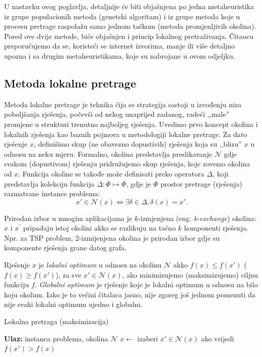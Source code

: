 \documentclass[b5paper, utf8, 11pt, colorlinks]{book}
\theoremstyle{definition}
\begin{document}
 U nastavku ovog poglavlja, detaljnije će biti objašnjena po jedna metaheuristika iz grupe populacionih metoda (genetski algoritam) i iz grupe metoda koje u procesu pretrage raspolažu samo jednom tačkom (metoda promjenljivih okolina). Pored ove dvije metode, biće objašnjen i princip lokalnog pretraživanja. Čitaocu preporučujemo da se, koristeći se internet izvorima, manje ili više detaljno upozna i sa drugim metaheuristikama, koje su nabrojane u ovom odjeljku.
 
  
 \subsection{Metoda lokalne pretrage}\label{sec: local_search}
 
 Metoda lokalne pretrage je tehnika čija se strategija sastoji u izvođenju niza poboljšanja  rješenja, počevši od nekog unaprijed zadanog, radeći ,,male'' promjene u strukturi trenutno najboljeg rješenja. Uvedimo prvo koncept okolina i lokalnih rješenja kao baznih pojmova u metodologiji lokalne pretrage. Za dato rješenje $x$, definišimo skup (ne obavezno dopustivih) rješenja koja su ,,blizu'' $x$ u odnosu na neku mjeru. Formalno, okolina predstavlja preslikavanje  $\mathcal{N}$ gdje svakom (dopustivom) rješenju pridružujemo skup rješenja, koje zovemo okolina od $x$.  Funkcija okoline se takođe može definisati preko operatora  $\Delta$, koji predstavlja kolekciju   funkcija $\Delta:\Phi \mapsto \Phi$,  gdje je $\Phi$ prostor pretrage (rješenja) razmatrane instance problema:
 $$ x' \in \mathcal{N}(x) \Longleftrightarrow \exists \delta \in \Delta,\delta(x)=x'.$$
 
 Prirodan izbor u mnogim aplikacijama je $k$-izmjenjena (eng. \emph{k-exchange}) okolina: $x$ i $x^{'}$ pripadaju istoj okolini akko se razlikuju na tačno $k$ komponenti rješenja. Npr. za TSP problem, 2-{izmijenjena} okolina je prirodan izbor gdje su komponente rješenja grane datog grafa.  
 
 
 Rješenje $x$ je \emph{lokalni optimum} u odnosu na okolinu $\mathcal{N}$ akko
 $f(x) \leq f(x')$ ($f(x) \geq f(x')$), za sve $x' \in \mathcal{N}(x)$, ako minimizujemo (maksimizujemo) ciljnu funkciju $f$.  \emph{Globalni optimum} je rješenje koje je lokalni optimum u odnosu na bilo koju okolinu.  Iako je to većini čitalaca jasno, nije zgoreg  još jednom pomenuti da nije svaki lokalni optimum ujedno i globalni. 
 
 \begin{algorithm}[!t] 
 	\caption{Lokalna pretraga (maksimizacija)}\label{alg:ls}
 	\begin{algorithmic}[1]
 		\STATE \textbf{Ulaz:} instanca problema, okolina $\mathcal{N}$
 		\STATE $ x \gets  \text{ izaberi } x' \in \mathcal{N}(x) $ ako vrijedi  $f(x') > f(x)$ 
 		\ENDWHILE
 	\end{algorithmic}
 \end{algorithm}
 
\end{document}
